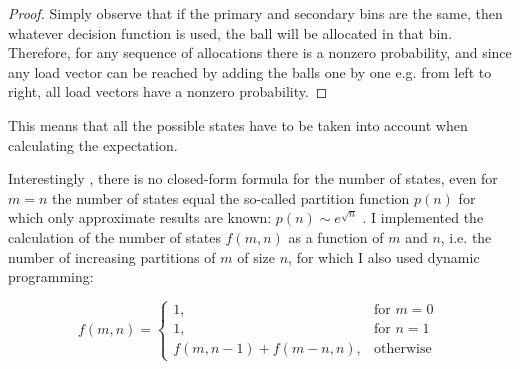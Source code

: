 \begin{proof}
    Simply observe that if the primary and secondary bins are the same, then whatever decision function is used, the ball will be allocated in that bin. Therefore, for any sequence of allocations there is a nonzero probability, and since any load vector can be reached by adding the balls one by one e.g. from left to right, all load vectors have a nonzero probability. 
\end{proof}

This means that all the possible states have to be taken into account when calculating the expectation.



Interestingly , there is no closed-form formula for the number of states, even for $m=n$ the number of states equal the so-called partition function $p(n)$ for which only approximate results are known: $p(n) \sim e^{\sqrt{n}}$ \cite{hardy1918partitionfunction}. I implemented the calculation of the number of states $f(m, n)$ as a function of $m$ and $n$, i.e. the number of increasing partitions of $m$ of size $n$, for which I also used dynamic programming:

\begin{equation} \label{eq: numberofpartitions}
    f(m, n) = \begin{cases}
        1, & \text{for } m=0\\
        1, & \text{for } n=1\\
        f(m,n-1)+f(m-n,n), & \text{otherwise }
    \end{cases}
\end{equation}




